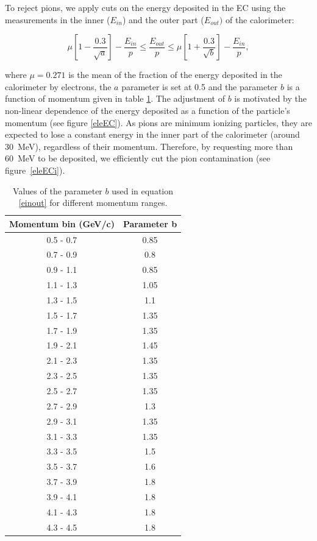 To reject pions, we apply cuts on the energy deposited
in the EC using the measurements in the inner ($E_{in}$) and the 
outer part ($E_{out})$ of the calorimeter:

\begin{equation}
\label{einout}
\mu  \left[1-\frac{0.3}{\sqrt{a}}\right] - \frac{E_{in}}{p} \leq 
\frac{E_{out}}{p} \leq 
\mu  \left[1+\frac{0.3}{\sqrt{b}}\right] - \frac{E_{in}}{p},
\end{equation}

where $\mu = 0.271$ is the mean of the fraction of the energy deposited in the 
calorimeter by electrons, the $a$ parameter is set at 0.5 and the parameter 
$b$ is a function of momentum given in table \ref{tab:ecoutin-par}. The 
adjustment of $b$ is motivated by the non-linear dependence of the energy 
deposited as a function of the particle's momentum (see figure \ref{eleEC}). As pions are 
minimum ionizing particles, they are expected to lose a constant energy in 
the inner part of the calorimeter (around 30~MeV), regardless of their 
momentum. Therefore, by requesting more than 60~MeV to be deposited, we 
efficiently cut the pion contamination (see figure~\ref{eleECi}).

\begin{table}[tbp]
  \centering
  \begin{tabular}{@{} cc @{}}
    \hline
    Momentum bin (GeV/c)& Parameter b \\ 
    \hline
    0.5 - 0.7 & 0.85 \\
    0.7 - 0.9 & 0.8  \\
    0.9 - 1.1 & 0.85 \\
    1.1 - 1.3 & 1.05 \\
    1.3 - 1.5 & 1.1  \\
    1.5 - 1.7 & 1.35 \\
    1.7 - 1.9 & 1.35 \\
    1.9 - 2.1 & 1.45 \\
    2.1 - 2.3 & 1.35 \\
    2.3 - 2.5 & 1.35 \\
    2.5 - 2.7 & 1.35 \\
    2.7 - 2.9 & 1.3  \\
    2.9 - 3.1 & 1.35 \\
    3.1 - 3.3 & 1.35 \\
    3.3 - 3.5 & 1.5  \\
    3.5 - 3.7 & 1.6  \\
    3.7 - 3.9 & 1.8  \\
    3.9 - 4.1 & 1.8  \\
    4.1 - 4.3 & 1.8  \\
    4.3 - 4.5 & 1.8  \\
    \hline
  \end{tabular}
  \caption{Values of the parameter $b$ used in equation \ref{einout} for 
           different momentum ranges.}
  \label{tab:ecoutin-par}
\end{table}

